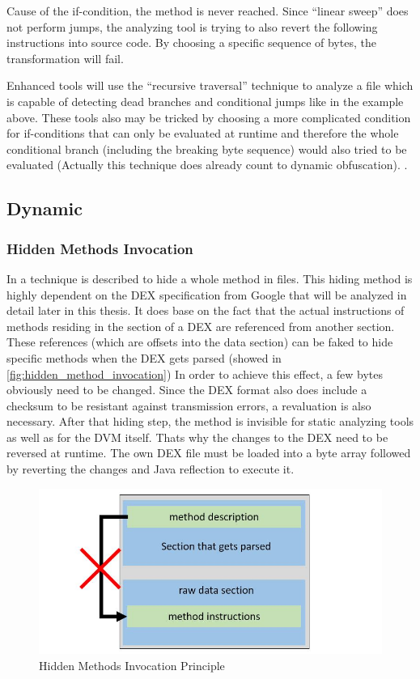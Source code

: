 Cause of the if-condition, the  method is never
reached. Since ``linear sweep'' does not perform jumps, the analyzing tool
is trying to also revert the following instructions into source code. By choosing a specific sequence of bytes, the transformation will fail.

Enhanced tools will use the ``recursive traversal'' technique to analyze a
file which is capable of detecting dead branches and conditional jumps like in the example above.
These tools also may be tricked by choosing a more complicated condition for
if-conditions that can only be evaluated at runtime and therefore the
whole conditional branch (including the breaking byte sequence) would also tried to be evaluated (Actually this technique does already count to dynamic obfuscation).
\parencite{lvl_imp}.

\subsection{Dynamic}
\subsubsection{Hidden Methods Invocation}
In \parencite{lvl_imp} a technique is described to hide a whole method
in  files. This hiding method is highly dependent on the DEX specification from Google \parencite{dex} that will be analyzed in detail
later in this thesis.
It does base on the fact that the actual instructions of methods residing
in the  section of a DEX are referenced from another section.
These references (which are offsets into the data section) can be faked
to hide specific methods when the DEX gets parsed
(showed in \autoref{fig:hidden_method_invocation}) In order to achieve
this effect, a few bytes obviously need to be changed.
Since the DEX format also does include a checksum to be resistant
against transmission errors, a revaluation is also necessary.
After that hiding step, the method is invisible for static analyzing tools
as well as for the DVM itself. Thats why the changes to the DEX need to
be reversed at runtime. The own DEX file must be loaded into a byte array
followed by reverting the changes and Java reflection to execute it.

\begin{figure}[htb]
  \includegraphics[width=\textwidth]{figures/hidden_method_invocation}
  \caption[Hidden Methods Invocation]{Hidden Methods Invocation Principle}
  \label{fig:hidden_method_invocation}
\end{figure}


